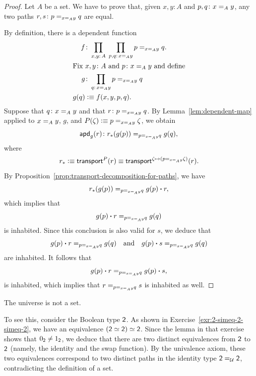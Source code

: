 \begin{proof}
    Let $A$ be a set. We have to prove that, given $x,y\colon A$ and $p,q\colon x\eq Ay$, any two paths $r,s\colon p\eq{x\eq Ay}q$ are equal.
    
    By definition, there is a dependent function
    \begin{align*}
        f&\colon\prod_{x,y\colon A}\;\prod_{p,q\colon x\eq Ay}
            p\eq{x\eq Ay}q.\\
    \intertext{Fix $x,y\colon A$ and $p\colon x\eq Ay$ and define}
        g&\colon\prod_{q\colon x\eq Ay}p\eq{x\eq Ay}q\\
        g(q)&\defeq f(x,y,p,q).
    \end{align*}
    Suppose that $q\colon x\eq Ay$ and that $r\colon p\eq{x\eq Ay}q$. By Lemma~\ref{lem:dependent-map} applied to $x\mathrel{=_{A}}y$, $g$, and $P(\zeta)\mathrel{\vcentcolon}\equiv p\mathrel{=_{x\mathrel{=_{A}}y}}\zeta$, we obtain
    \[
        \fun{apd}_g(r)\colon r_*(g(p))\eq{p\eq{x\eq Ay}q}g(q),
    \]
    where
    \[
        r_*\mathrel{\vcentcolon}\equiv\mathsf{transport}^P(r)\equiv\mathsf{transport}^{\zeta\mapsto (p\mathrel{=_{x\mathrel{=_{A}}y}}\zeta)}(r).
    \]
    By Proposition~\ref{prop:transport-decomposition-for-paths}, we have
    \[
        r_*(g(p))\mathrel{=_{p\mathrel{=_{x\mathrel{=_{A}}y}}q}}g(p)\mathbin{\boldsymbol{\cdot}} r,
    \]
    which implies that
    \[
        g(p)\mathbin{\boldsymbol{\cdot}} r\mathrel{=_{p\mathrel{=_{x\mathrel{=_{A}}y}}q}}g(q)
    \]
    is inhabited. Since this conclusion is also valid for $s$, we deduce that
    \[
        g(p)\mathbin{\boldsymbol{\cdot}} r\mathrel{=_{p\mathrel{=_{x\mathrel{=_{A}}y}}q}}g(q)
        \quad\text{and}\quad
        g(p)\mathbin{\boldsymbol{\cdot}} s\mathrel{=_{p\mathrel{=_{x\mathrel{=_{A}}y}}q}}g(q)
    \]
    are inhabited. It follows that
    \[
        g(p)\mathbin{\boldsymbol{\cdot}} r\mathrel{=_{p\mathrel{=_{x\mathrel{=_{A}}y}}q}}g(p)\mathbin{\boldsymbol{\cdot}} s,
    \]
    is inhabited, which implies that $r\mathrel{=_{p\mathrel{=_{x\mathrel{=_{A}}y}}q}}s$ is inhabited as well.
    
\end{proof}

\begin{xmpl}\ua\label{xmpl:univ-isnt-a-set}
    The universe is not a set.
    
    To see this, consider the Boolean type $\mathsf{2}$. As shown in Exercise~\ref{exr:2-simeq-2-simeq-2}, we have an equivalence $(\mathsf{2}\simeq\mathsf{2})\simeq\mathsf{2}$. Since the lemma in that exercise shows that $0_{\mathsf{2}}\ne1_{\mathsf{2}}$, we deduce that there are two distinct equivalences from $\mathsf{2}$ to $\mathsf{2}$ (namely, the identity and the swap function). By the univalence axiom, these two equivalences correspond to two distinct paths in the identity type $\mathsf{2}\mathrel{=_{\mathcal U}}\mathsf{2}$, contradicting the definition of a set.
\end{xmpl}

